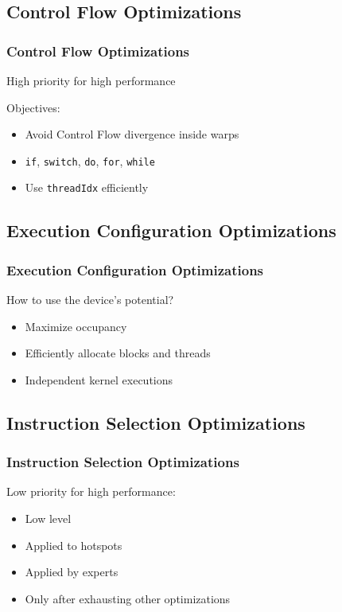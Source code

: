\documentclass[10pt, compress]{beamer}
\begin{document}
\subsection{Control Flow Optimizations}

\begin{frame}
    \frametitle{Control Flow Optimizations}
    \alert{High priority} for \alert{high performance}


    Objectives:
    \begin{itemize}
        \item Avoid \alert{Control Flow divergence} inside warps

        \item \texttt{\alert{if}}, \texttt{\alert{switch}},
            \texttt{\alert{do}}, \texttt{\alert{for}}, \texttt{\alert{while}}

        \item Use \texttt{\alert{threadIdx}} efficiently
    \end{itemize}
\end{frame}

\subsection{Execution Configuration Optimizations}

\begin{frame}
    \frametitle{Execution Configuration Optimizations}
    How to use the \alert{device}'s potential?

    \begin{itemize}
        \item Maximize \alert{occupancy}

        \item Efficiently allocate \alert{blocks} and \alert{threads}

        \item Independent \alert{kernel} executions
    \end{itemize}
\end{frame}

\subsection{Instruction Selection Optimizations}

\begin{frame}
    \frametitle{Instruction Selection Optimizations}
    \alert{Low priority} for \alert{high performance}:

    \begin{itemize}
        \item \alert{Low level}

        \item Applied to \alert{hotspots}

        \item Applied by \alert{experts}
        \item Only after \alert{exhausting} other optimizations
    \end{itemize}
\end{frame}
\end{document}
